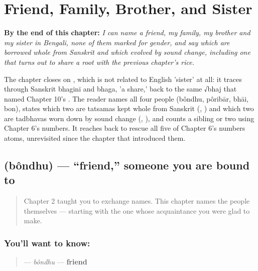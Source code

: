 
\chapter{Friend, Family, Brother, and Sister}
\label{ch:bn-friend-family-brother-sister}

\begin{chapteropening}
\textbf{By the end of this chapter:} \emph{I can name a friend, my family, my brother and my sister in Bengali, none of them marked for gender, and say which are borrowed whole from Sanskrit and which evolved by sound change, including one that turns out to share a root with the previous chapter's rice.}

The chapter closes on , which is not related to English 'sister' at all: it traces through Sanskrit bhaginī and bhaga, 'a share,' back to the same √bhaj that named Chapter 10's . The reader names all four people (bôndhu, pôribār, bhāi, bon), states which two are tatsamas kept whole from Sanskrit (, ) and which two are tadbhavas worn down by sound change (, ), and counts a sibling or two using Chapter 6's numbers. It reaches back to rescue all five of Chapter 6's numbers atoms, unrevisited since the chapter that introduced them.
\end{chapteropening}

\section[bôndhu]{ (bôndhu) — \textquotedblleft{}friend,\textquotedblright{} someone you are bound to}

\label{lesson:BN-C11-bondhu}



\begin{quote}
Chapter 2 taught you to exchange names. This chapter names the people themselves — starting with the one whose acquaintance you were glad to make.
\end{quote}

\subsection*{You'll want to know: }
\begin{quote}
\textbf{} — \emph{bôndhu} — \textbf{friend}
\end{quote}


